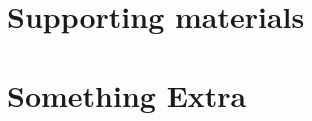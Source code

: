 ﻿\chapter{Supporting materials}
\label{sec:supportingMaterial}
\cleardoublepage




\chapter{Something Extra}
\label{sec:somethingExtra}
\cleardoublepage